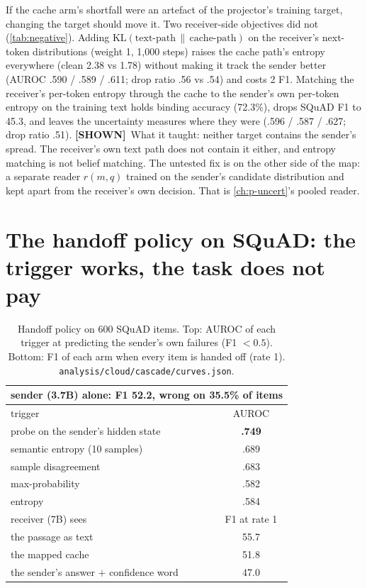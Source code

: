 \documentclass[11pt,a4paper]{report}
\newcommand{\SHOWN}{\textcolor{shownc}{\textbf{\scriptsize[SHOWN]}}}
\begin{document}
If the cache arm's shortfall were an artefact of the projector's training target, changing the target should move it. Two receiver-side objectives did not (\cref{tab:negative}). Adding $\mathrm{KL}(\text{text-path} \,\|\, \text{cache-path})$ on the receiver's next-token distributions (weight 1, 1,000 steps) raises the cache path's entropy everywhere (clean 2.38 vs 1.78) without making it track the sender better (AUROC .590 / .589 / .611; drop ratio .56 vs .54) and costs 2 F1. Matching the receiver's per-token entropy through the cache to the sender's own per-token entropy on the training text holds binding accuracy (72.3\%), drops SQuAD F1 to 45.3, and leaves the uncertainty measures where they were (.596 / .587 / .627; drop ratio .51). \SHOWN\ What it taught: neither target contains the sender's spread. The receiver's own text path does not contain it either, and entropy matching is not belief matching. The untested fix is on the other side of the map: a separate reader $r(m, q)$ trained on the sender's candidate distribution and kept apart from the receiver's own decision. That is \cref{ch:p-uncert}'s pooled reader.

\section{The handoff policy on SQuAD: the trigger works, the task does not pay}

\begin{table}[h]
\caption{Handoff policy on 600 SQuAD items. Top: AUROC of each trigger at predicting the sender's own failures (F1 $< 0.5$). Bottom: F1 of each arm when every item is handed off (rate 1). \texttt{analysis/cloud/cascade/curves.json}.}
\label{tab:policy}
\vskip 0.1in
\begin{center}
\begin{small}
\begin{tabular}{lc}
\toprule
\multicolumn{2}{l}{sender (3.7B) alone: F1 52.2, wrong on 35.5\% of items} \\
\midrule
trigger & AUROC \\
\midrule
probe on the sender's hidden state & \textbf{.749} \\
semantic entropy (10 samples)                 & .689 \\
sample disagreement                           & .683 \\
max-probability                               & .582 \\
entropy                                       & .584 \\
\midrule
receiver (7B) sees & F1 at rate 1 \\
\midrule
the passage as text          & 55.7 \\
the mapped cache             & 51.8 \\
the sender's answer $+$ confidence word & 47.0 \\
\bottomrule
\end{tabular}
\end{small}
\end{center}
\end{table}
\end{document}
